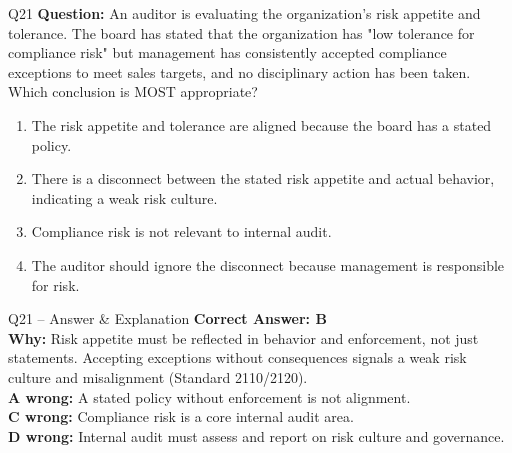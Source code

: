 \documentclass[aspectratio=169,10pt]{beamer}
\begin{document}
	\begin{frame}[t]{Q21}
		\small
		\textbf{Question:} An auditor is evaluating the organization's risk appetite and tolerance. The board has stated that the organization has "low tolerance for compliance risk" but management has consistently accepted compliance exceptions to meet sales targets, and no disciplinary action has been taken. Which conclusion is MOST appropriate?
		\begin{enumerate}[label=\Alph*.,itemsep=1pt,topsep=2pt]
			\item The risk appetite and tolerance are aligned because the board has a stated policy.
			\item There is a disconnect between the stated risk appetite and actual behavior, indicating a weak risk culture.
			\item Compliance risk is not relevant to internal audit.
			\item The auditor should ignore the disconnect because management is responsible for risk.
		\end{enumerate}
	\end{frame}
	
	\begin{frame}[t]{Q21 -- Answer \& Explanation}
		\small
		\textbf{Correct Answer: B} \\[4pt]
		\textbf{Why:} Risk appetite must be reflected in behavior and enforcement, not just statements. Accepting exceptions without consequences signals a weak risk culture and misalignment (Standard 2110/2120). \\[4pt]
		\textbf{A wrong:} A stated policy without enforcement is not alignment. \\[2pt]
		\textbf{C wrong:} Compliance risk is a core internal audit area. \\[2pt]
		\textbf{D wrong:} Internal audit must assess and report on risk culture and governance.
	\end{frame}
	
\end{document}
